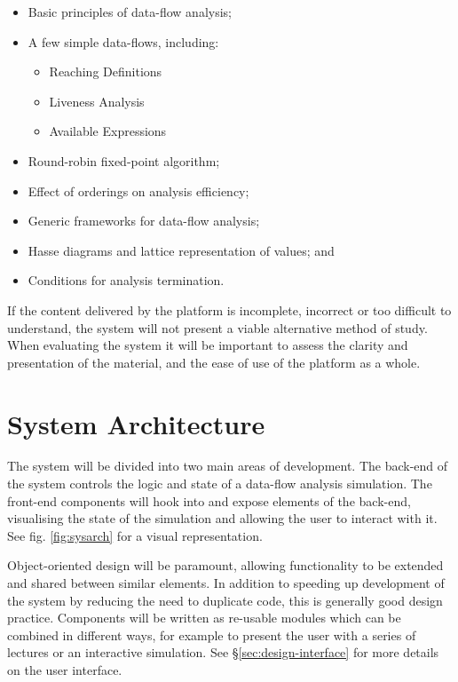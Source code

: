 \documentclass[bsc,twoside,singlespacing,parskip,logo,notimes,normalheadings]{infthesis}
\begin{document}
        \begin{itemize}
        \item Basic principles of data-flow analysis;
        \item A few simple data-flows, including:
          \begin{itemize}
          \item Reaching Definitions
          \item Liveness Analysis
          \item Available Expressions
          \end{itemize}
        \item Round-robin fixed-point algorithm;
        \item Effect of orderings on analysis efficiency;
        \item Generic frameworks for data-flow analysis;
        \item Hasse diagrams and lattice representation of values; and
        \item Conditions for analysis termination.
        \end{itemize}        

        If the content delivered by the platform is incomplete,
        incorrect or too difficult to understand, the system will not
        present a viable alternative method of study. When evaluating
        the system it will be important to assess the clarity and
        presentation of the material, and the ease of use of the
        platform as a whole.


    \section{System Architecture}
    The system will be divided into two main areas of development. The
    back-end of the system controls the logic and state of a data-flow
    analysis simulation. The front-end components will hook into and
    expose elements of the back-end, visualising the state of the
    simulation and allowing the user to interact with it. See
    fig. \ref{fig:sysarch} for a visual representation.
    
    Object-oriented design will be paramount, allowing functionality
    to be extended and shared between similar elements. In addition to
    speeding up development of the system by reducing the need to
    duplicate code, this is generally good design practice. Components
    will be written as re-usable modules which can be combined in
    different ways, for example to present the user with a series of
    lectures or an interactive simulation. See
    \S\ref{sec:design-interface} for more details on the user
    interface.
\end{document}
